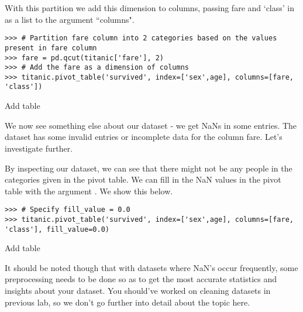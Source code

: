 With this partition we add this dimension to columns, passing fare and `class' in as a list to the argument ``columns".

\begin{lstlisting}
>>> # Partition fare column into 2 categories based on the values present in fare column
>>> fare = pd.qcut(titanic['fare'], 2)
>>> # Add the fare as a dimension of columns
>>> titanic.pivot_table('survived', index=['sex',age], columns=[fare, 'class'])
\end{lstlisting}

Add table

We now see something else about our dataset - we get NaNs in some entries. The dataset has some invalid entries or incomplete data for the column fare. Let's investigate further.

By inspecting our dataset, we can see that there might not be any people in the categories given in the pivot table. We can fill in the NaN values in the pivot table with the argument . We show this below.

\begin{lstlisting}
>>> # Specify fill_value = 0.0
>>> titanic.pivot_table('survived', index=['sex',age], columns=[fare, 'class'], fill_value=0.0)
\end{lstlisting}

Add table

It should be noted though that with datasets where NaN's occur frequently, some preprocessing needs to be done so as to get the most accurate statistics and insights about your dataset. You should've worked on cleaning datasets in previous lab, so we don't go further into detail about the topic here.

